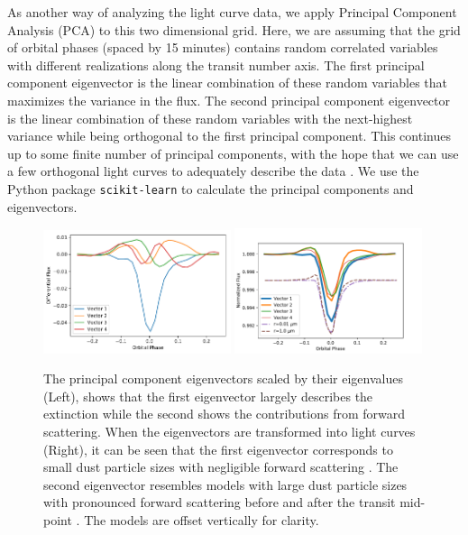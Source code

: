 \documentclass[preprint,trackchanges]{aastex61}
\begin{document}
As another way of analyzing the light curve data, we apply Principal Component Analysis (PCA) to this two dimensional grid.
Here, we are assuming that the grid of orbital phases (spaced by 15 minutes) contains random correlated variables with different realizations along the transit number axis.
The first principal component eigenvector is the linear combination of these random variables that maximizes the variance in the flux.
The second principal component eigenvector is the linear combination of these random variables with the next-highest variance while being orthogonal to the first principal component.
This continues up to some finite number of principal components, with the hope that we can use a few orthogonal light curves to adequately describe the data \citep[e.g.][]{jolliffe2002pca}.
We use the Python package \texttt{scikit-learn} \citep{pedregosa2011scikit-learn} to calculate the principal components and eigenvectors.
\begin{figure}[!hbtp]
\begin{centering}
\includegraphics[width=0.49\textwidth]{pca_k1255.pdf}
\includegraphics[width=0.49\textwidth]{pca_k1255_transformed.pdf}
\caption{The principal component eigenvectors scaled by their eigenvalues (Left), shows that the first eigenvector largely describes the extinction while the second shows the contributions from forward scattering.
When the eigenvectors are transformed into light curves (Right), it can be seen that the first eigenvector corresponds to small dust particle sizes with negligible forward scattering \citep[dash-dot purple model][]{budaj12}.
The second eigenvector resembles models with large dust particle sizes with pronounced forward scattering before and after the transit mid-point \citep[dashed brown model][]{budaj12}.
The models are offset vertically for clarity.
}\label{fig:pcaVectorsComp}
\end{centering}
\end{figure}
\end{document}
